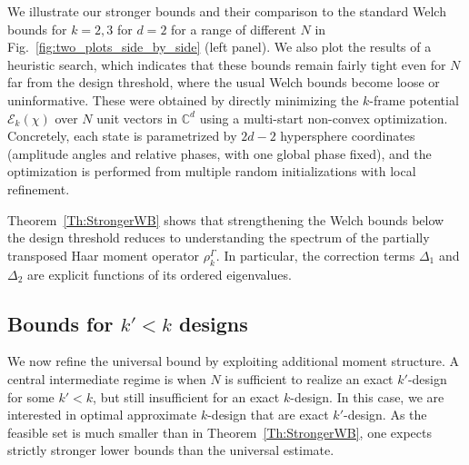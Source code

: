 \documentclass[aps,twocolumn,pra,superscriptaddress,nofootinbib]{revtex4-2}
\begin{document}
We illustrate our stronger bounds and their comparison to the standard Welch bounds for $k=2,3$ for $d=2$ for a range of different $N$ in Fig.~\ref{fig:two_plots_side_by_side} (left panel). We also plot the results of a heuristic search, which indicates that these bounds remain fairly tight even for $N$ far from the design threshold, where the usual Welch bounds become loose or uninformative. These were obtained by directly minimizing the $k$-frame potential $\mathcal{E}_k(\chi)$
over $N$ unit vectors in $\mathbb{C}^d$ using a multi-start non-convex optimization. Concretely, each state is parametrized by $2d-2$ hypersphere coordinates (amplitude angles and relative phases, with one global phase fixed), and the optimization is performed from multiple random initializations with local refinement.



Theorem~\ref{Th:StrongerWB} shows that strengthening the Welch bounds below the design threshold reduces to
understanding the spectrum of the partially transposed Haar moment operator $\rho_k^{\mathsf{\Gamma}}$.
In particular, the correction terms $\Delta_1$ and $\Delta_2$ are explicit functions of its ordered eigenvalues.


\subsection{Bounds for $k'<k$ designs}

We now refine the universal bound by exploiting additional moment structure.
A central intermediate regime is when $N$ is sufficient to realize an exact $k'$-design for some $k'<k$,
but still insufficient for an exact $k$-design.
In this case, we are interested in optimal approximate $k$-design that are exact $k'$-design.
As the feasible set is much smaller than in Theorem~\ref{Th:StrongerWB},
one expects strictly stronger lower bounds than the universal estimate.
\end{document}
